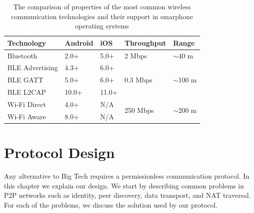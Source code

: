 \begin{table}
    \centering
    \begin{tabular}{ | l | l | l | l | l | }
      \hline
      \textbf{Technology} & \textbf{Android} & \textbf{iOS} & \textbf{Throughput} & \textbf{Range} \\
      \hline
      Bluetooth & 2.0+ & 5.0+ & 2 Mbps & $\sim$40 m \\
      \hline
      BLE Advertising & 4.3+ & 6.0+ & \multirow{3}{*}{0.3 Mbps} & \multirow{3}{*}{$\sim$100 m} \\
      BLE GATT & 5.0+ & 6.0+ & &  \\
      BLE L2CAP & 10.0+ & 11.0+ & &  \\
      \hline
      Wi-Fi Direct & 4.0+ & N/A & \multirow{2}{*}{250 Mbps} & \multirow{2}{*}{$\sim$200 m} \\
      Wi-Fi Aware & 8.0+ & N/A & & \\
      \hline
    \end{tabular}
    \caption{The comparison of properties of the most common wireless communication technologies and their support in smarphone operating systems
    }
    \label{wirelesstech_table}
  \end{table}







\chapter{Protocol Design}
\label{design}

Any alternative to Big Tech requires a permissionless communication protocol. In this chapter we explain our design. We start by describing common problems in P2P networks such as identity, peer discovery, data transport, and NAT traversal. For each of the problems, we discuss the solution used by our protocol. %

